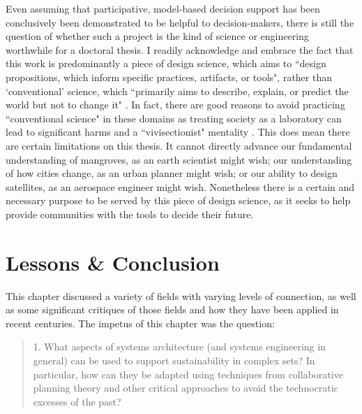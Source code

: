 Even assuming that participative, model-based decision support has been conclusively been demonstrated to be helpful to decision-makers, there is still the question of whether such a project is the kind of science or engineering worthwhile for a doctoral thesis. I readily acknowledge and embrace the fact that this work is predominantly a piece of design science, which aims to ``design propositions, which inform specific practices, artifacts, or tools", rather than `conventional' science, which ``primarily aims to describe, explain, or predict the world but not to change it" \cite{goodspeedScenarioPlanningCities2020}. In fact, there are good reasons to avoid practicing ``conventional science" in these domains as treating society as a laboratory can lead to significant harms and a ``vivisectionist" mentality \cite{banandynuriModernMedicineIts1990}. This does mean there are certain limitations on this thesis. It cannot directly advance our fundamental understanding of mangroves, as an earth scientist might wish; our understanding of how cities change, as an urban planner might wish; or our ability to design satellites, as an aerospace engineer might wish. Nonetheless there is a certain and necessary purpose to be served by this piece of design science, as it seeks to help provide communities with the tools to decide their future.







\section{Lessons \& Conclusion} \label{sec:chap2-conc}

This chapter discussed a variety of fields with varying levels of connection, as well as some significant critiques of those fields and how they have been applied in recent centuries. The impetus of this chapter was the question:

\blockquote{ 1. What aspects of systems architecture (and systems engineering in general) can be used to support sustainability in complex \ac{sets}? In particular, how can they be adapted using techniques from collaborative planning theory and other critical approaches to avoid the technocratic excesses of the past?}

